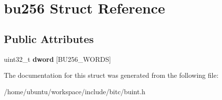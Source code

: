 \hypertarget{structbu256}{\section{bu256 Struct Reference}
\label{structbu256}
}
\subsection*{Public Attributes}
\begin{DoxyCompactItemize}
\item 
\hypertarget{structbu256_a0f4db5ad2956a9083bee133a6d4fbb78}{uint32\-\_\-t {\bfseries dword} \mbox{[}B\-U256\-\_\-\-W\-O\-R\-D\-S\mbox{]}}\label{structbu256_a0f4db5ad2956a9083bee133a6d4fbb78}

\end{DoxyCompactItemize}


The documentation for this struct was generated from the following file\-:\begin{DoxyCompactItemize}
\item 
/home/ubuntu/workspace/include/bitc/buint.\-h\end{DoxyCompactItemize}
